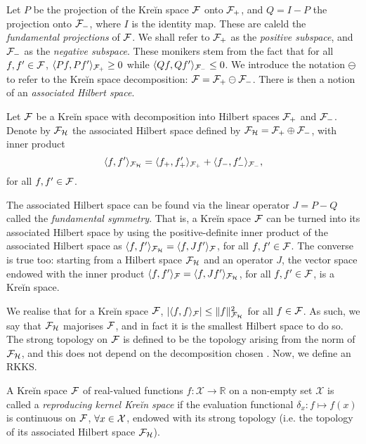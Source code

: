 Let $P$ be the projection of the Kreĭn space ${\mathcal F}$ onto ${\mathcal F}_+$, and $Q=I-P$ the projection onto ${\mathcal F}_-$, where $I$ is the identity map.
These are caleld the \emph{fundamental projections} of ${\mathcal F}$.
We shall refer to ${\mathcal F}_+$ as the \emph{positive subspace}, and ${\mathcal F}_-$ as the \emph{negative subspace}.
These monikers stem from the fact that for all $f,f' \in {\mathcal F}$, $\langle Pf,Pf'\rangle_{{\mathcal F}_+} \geq 0$ while $\langle Qf,Qf'\rangle_{{\mathcal F}_-} \leq 0$.
We introduce the notation $\ominus$ to refer to the Kreĭn space decomposition: ${\mathcal F} = {\mathcal F}_+ \ominus {\mathcal F}_-$.
There is then a notion of an \emph{associated Hilbert space}.

\begin{definition}
  Let ${\mathcal F}$ be a Kreĭn space with decomposition into Hilbert spaces ${\mathcal F}_+$ and ${\mathcal F}_-$.
  Denote by ${\mathcal F}_{\mathcal H}$ the associated Hilbert space defined by ${\mathcal F}_{\mathcal H} = {\mathcal F}_+ \oplus {\mathcal F}_-$, with inner product 
  \[
    \langle f,f'\rangle_{{\mathcal F}_{\mathcal H}} = \langle f_+,f_+'\rangle_{{\mathcal F}_+} + \langle f_-,f_-'\rangle_{{\mathcal F}_-},
  \]
  for all $f,f'\in{\mathcal F}$.
\end{definition}

The associated Hilbert space can be found via the linear operator $J = P - Q$ called the \emph{fundamental symmetry}.
That is, a Kreĭn space ${\mathcal F}$ can be turned into its associated Hilbert space by using the positive-definite inner product of the associated Hilbert space as $\langle f,f'\rangle_{{\mathcal F}_{\mathcal H}} = \langle f,Jf'\rangle_{\mathcal F}$, for all $f,f'\in{\mathcal F}$.
The converse is true too: starting from a Hilbert space ${\mathcal F}_{\mathcal H}$ and an operator $J$, the vector space endowed with the inner product $\langle f,f'\rangle_{\mathcal F} = \langle f,Jf'\rangle_{{\mathcal F}_{\mathcal H}}$, for all $f,f'\in{\mathcal F}$, is a Kreĭn space.

We realise that for a Kreĭn space ${\mathcal F}$, $|\langle f,f\rangle_{\mathcal F}| \leq \lVert f\rVert^2_{{\mathcal F}_{\mathcal H}}$ for all $f\in{\mathcal F}$.
As such, we say that ${\mathcal F}_{\mathcal H}$ majorises ${\mathcal F}$, and in fact it is the smallest Hilbert space to do so.
The strong topology on ${\mathcal F}$ is defined to be the topology arising from the norm of ${\mathcal F}_{\mathcal H}$, and this does not depend on the decomposition chosen \citep{ong2004learning}.
Now, we define an RKKS.

\begin{definition}
  A Kreĭn space ${\mathcal F}$ of real-valued functions $f:\mathcal X \rightarrow \mathbb R$ on a non-empty set $\mathcal X$ is called a \emph{reproducing kernel Kreĭn space} if the evaluation functional $\delta_x: f \mapsto f(x)$ is continuous on ${\mathcal F}$, $\forall x \in {\mathcal X}$, endowed with its strong topology (i.e. the topology of its associated Hilbert space ${\mathcal F}_{\mathcal H}$).
\end{definition}

